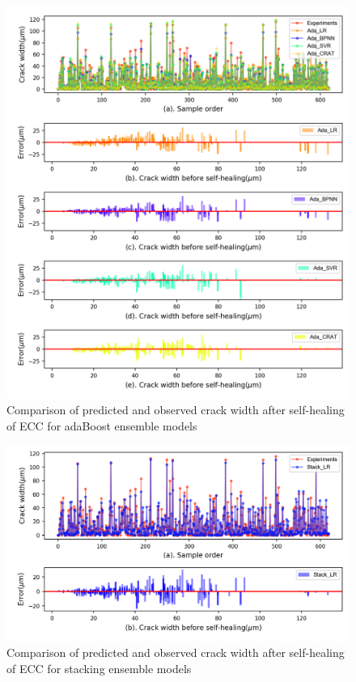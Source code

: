 \documentclass[11pt]{article}
\begin{document}
		\begin{figure}[!h]
		\centering
		\includegraphics[width=\textwidth]{AdaError.png}
		\caption{Comparison of predicted and observed crack width after self-healing of ECC for adaBoost ensemble models}
		\label{error3}
	\end{figure}

		\begin{figure}[!h]
	\centering
	\includegraphics[width=\textwidth]{StackError.png}
	\caption{Comparison of predicted and observed crack width after self-healing of ECC for stacking ensemble models}
	\label{error4}
\end{figure}
\end{document}
